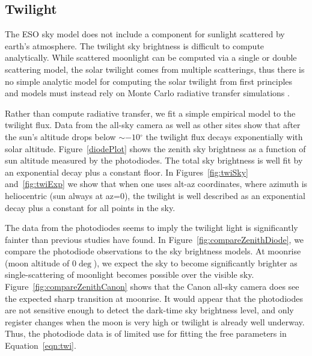 \documentclass[]{spie}
\newcommand\degree{{^\circ}}
\begin{document}
\subsection{Twilight}

The ESO sky model does not include a component for sunlight scattered by earth's atmosphere.  The twilight sky brightness is difficult to compute analytically.  While scattered moonlight can be computed via a single or double scattering model, the solar twilight comes from multiple scatterings, thus there is no simple analytic model for computing the solar twilight from first principles and models must instead rely on Monte Carlo radiative transfer simulations \cite{Patat06}.

Rather than compute radiative transfer, we fit a simple empirical model to the twilight flux.  Data from the all-sky camera as well as other sites show that after the sun's altitude drops below $\sim-10\degree$ the twilight flux decays exponentially with solar altitude. Figure~\ref{diodePlot} shows the zenith sky brightness as a function of sun altitude measured by the photodiodes. The total sky brightness is well fit by an exponential decay plus a constant floor.  In Figures~\ref{fig:twiSky} and~\ref{fig:twiExp} we show that when one uses alt-az coordinates, where azimuth is heliocentric (sun always at az=0), the twilight is well described as an exponential decay plus a constant for all points in the sky.

The data from the photodiodes seems to imply the twilight light is significantly fainter than previous studies have found. In Figure~\ref{fig:compareZenithDiode}, we compare the photodiode observations to the sky brightness models. At moonrise (moon altitude of 0$\deg$), we expect the sky to become significantly brighter as single-scattering of moonlight becomes possible over the visible sky.  Figure~\ref{fig:compareZenithCanon} shows that the Canon all-sky camera does see the expected sharp transition at moonrise.  It would appear that the photodiodes are not sensitive enough to detect the dark-time sky brightness level, and only register changes when the moon is very high or twilight is already well underway. Thus, the photodiode data is of limited use for fitting the free parameters in Equation~\ref{eqn:twi}.
\end{document}

